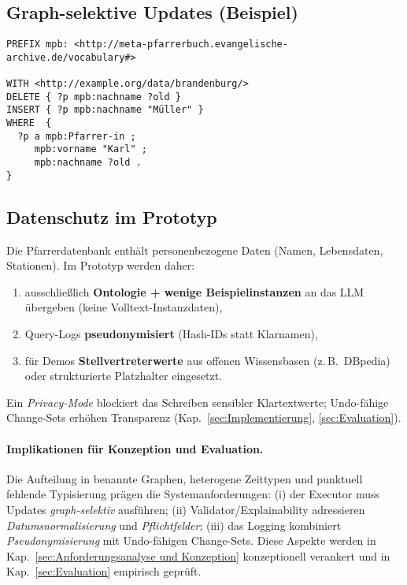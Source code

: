 \subsection*{Graph-selektive Updates (Beispiel)}
\begin{lstlisting}[language=SPARQL,caption={Update im benannten Graph (Beispiel-IRI).},label={lst:update-graph}]
PREFIX mpb: <http://meta-pfarrerbuch.evangelische-archive.de/vocabulary#>

WITH <http://example.org/data/brandenburg/>
DELETE { ?p mpb:nachname ?old }
INSERT { ?p mpb:nachname "Müller" }
WHERE  {
  ?p a mpb:Pfarrer-in ;
     mpb:vorname "Karl" ;
     mpb:nachname ?old .
}
\end{lstlisting}

\subsection*{Datenschutz im Prototyp}
Die Pfarrerdatenbank enthält personenbezogene Daten (Namen, Lebensdaten, Stationen). Im Prototyp werden daher:
\begin{enumerate}
  \item ausschließlich \textbf{Ontologie + wenige Beispielinstanzen} an das LLM übergeben (keine Volltext-Instanzdaten),
  \item Query-Logs \textbf{pseudonymisiert} (Hash-IDs statt Klarnamen),
  \item für Demos \textbf{Stellvertreterwerte} aus offenen Wissensbasen (z.\,B.\ DBpedia) oder strukturierte Platzhalter eingesetzt.
\end{enumerate}
Ein \emph{Privacy-Mode} blockiert das Schreiben sensibler Klartextwerte; Undo-fähige Change-Sets erhöhen Transparenz (Kap.~\ref{sec:Implementierung}, \ref{sec:Evaluation}).

\paragraph{Implikationen für Konzeption und Evaluation.}
Die Aufteilung in benannte Graphen, heterogene Zeittypen und punktuell fehlende Typisierung prägen die Systemanforderungen: (i) der Executor muss Updates \emph{graph-selektiv} ausführen; (ii) Validator/Explainability adressieren \emph{Datumsnormalisierung} und \emph{Pflichtfelder}; (iii) das Logging kombiniert \emph{Pseudonymisierung} mit Undo-fähigen Change-Sets. Diese Aspekte werden in Kap.~\ref{sec:Anforderungsanalyse und Konzeption} konzeptionell verankert und in Kap.~\ref{sec:Evaluation} empirisch geprüft.








